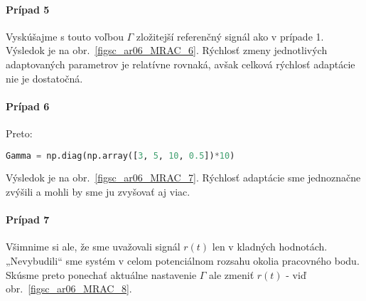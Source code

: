 \documentclass[a4paper, 10pt, ]{article}
\begin{document}
\begin{figure}[!b]
	\centering

    \vspace{-3mm}


    \vspace{-2mm}

	\caption{}
	\label{figsc_ar06_MRAC_5}


    \vspace{-2mm}

\end{figure}








\paragraph{Prípad 5}

Vyskúšajme s touto voľbou $\Gamma$ zložitejší referenčný signál ako v prípade 1. Výsledok je na obr.~\ref{figsc_ar06_MRAC_6}. Rýchlosť zmeny jednotlivých adaptovaných parametrov je relatívne rovnaká, avšak celková rýchlosť adaptácie nie je dostatočná.








\paragraph{Prípad 6}

Preto:
\begin{lstlisting}[language=Python,
                   numbers=none,
                    ]
Gamma = np.diag(np.array([3, 5, 10, 0.5])*10)
\end{lstlisting}
Výsledok je na obr.~\ref{figsc_ar06_MRAC_7}. Rýchlosť adaptácie sme jednoznačne zvýšili a mohli by sme ju zvyšovať aj viac.







\paragraph{Prípad 7}

Všimnime si ale, že sme uvažovali signál $r(t)$ len v kladných hodnotách. „Nevybudili“ sme systém v celom potenciálnom rozsahu okolia pracovného bodu. Skúsme preto ponechať aktuálne nastavenie $\Gamma$ ale zmeniť $r(t)$ - viď obr.~\ref{figsc_ar06_MRAC_8}.
\end{document}
